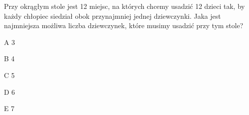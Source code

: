 \begin{tresc}
Przy okrągłym stole jest 12 miejsc, na których chcemy usadzić 12 dzieci tak, by każdy chłopiec siedział obok przynajmniej jednej dziewczynki. Jaka jest najmniejsza możliwa liczba dziewczynek, które musimy usadzić przy tym stole?
\end{tresc}
\begin{wariant}{A} 3 \end{wariant}
\begin{wariant}{B} 4 \end{wariant}
\begin{wariant}{C} 5 \end{wariant}
\begin{wariant}{D} 6 \end{wariant}
\begin{wariant}{E} 7 \end{wariant}
